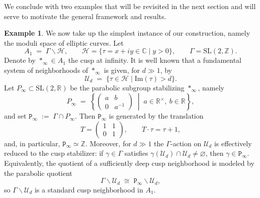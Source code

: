 \documentclass[11pt]{amsart}
\theoremstyle{plain}
\theoremstyle{definition}
\newtheorem{example}[theorem]{Example}
\theoremstyle{remark}
\newcommand{\C}{{\mathbb C}}
\newcommand{\R}{\mathbb R}
\newcommand{\Z}{\mathbb{Z}}
\newcommand{\im}{\mathrm{Im}}
\newcommand{\cH}{\mathcal{H}}
\newcommand{\tP}{\mathtt{P}}
\newcommand{\SL}{\mathrm{SL}}
\begin{document}
We conclude with two examples that will be revisited in the next section and will serve to motivate the general framework and results.
\begin{example}
    \label{ex:wp.ellip}
    We now take up the simplest instance of our construction, namely the moduli space of elliptic curves. Let
    \[
      A_1 \;=\; \Gamma\backslash \cH,
      \qquad
      \cH=\{\tau=x+iy\in\C \mid y>0\},
      \qquad
      \Gamma=\SL(2,\Z).
    \]
    Denote by $*_\infty\in A_1$ the cusp at infinity. It is well known that a fundamental system of neighborhoods of $*_\infty$ is given, for $d\gg 1$, by
    \[
      \mathcal U_d \;=\; \{\tau\in\cH \mid \im(\tau)>d\}.
    \]
    Let $P_\infty\subset \SL(2,\R)$ be the parabolic subgroup stabilizing $*_\infty$, namely
    \[
      P_\infty \;=\;
      \left\{
        \begin{pmatrix} a & b \\ 0 & a^{-1}\end{pmatrix}
        \;\middle|\;
        a\in\R^\times,\ b\in\R
      \right\},
    \]
    and set $\tP_\infty \;:=\; \Gamma\cap P_\infty$. Then $\tP_\infty$ is generated by the translation
    \[
      T=\begin{pmatrix}1&1\\0&1\end{pmatrix},
      \qquad
      T\cdot\tau=\tau+1,
    \]
    and, in particular, $\tP_\infty\simeq \Z$.
    Moreover, for $d\gg 1$ the $\Gamma$-action on $\mathcal U_d$ is effectively reduced to the cusp stabilizer: if $\gamma\in\Gamma$ satisfies $\gamma(\mathcal U_d)\cap \mathcal U_d\neq\varnothing$, then $\gamma\in\tP_\infty$.
    Equivalently, the quotient of a sufficiently deep cusp neighborhood is modeled by the parabolic quotient
    \[
      \Gamma\backslash \mathcal U_d \;\cong\; \tP_\infty\backslash \mathcal U_d,
    \]
    so $\Gamma\backslash \mathcal U_d$ is a standard cusp neighborhood in $A_1$. 
    

\end{example}
\end{document}
